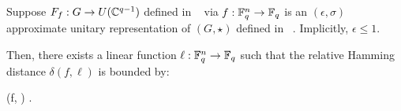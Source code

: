     


\begin{lemma} \label{lem:gh_linearity_formalized}\leanok
Suppose $F_f: G \to U(\mathbb{C}^{q-1})$ defined in ~ via $f : \mathbb{F}_q^n \to \mathbb{F}_q$ is an $(\epsilon, \sigma)$ approximate unitary representation of $(G, \star)$ defined in ~. 
Implicitly, $\epsilon \leq 1$.

Then, there exists a linear function $\ell: \mathbb{F}_q^n \to \mathbb{F}_q$ such that the relative Hamming distance $\delta(f, \ell)$ is bounded by:

\be\label{eq:GH-linear-bound}
\delta(f, \ell) \le {} \epsilon.
\ee
\end{lemma}

